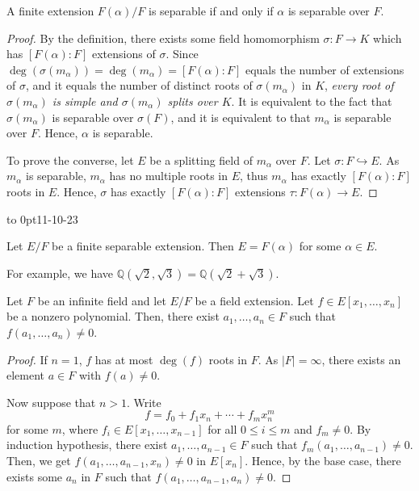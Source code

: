 \documentclass[twoside]{article}
\newcommand\Q{\mathbb Q}
\theoremstyle{remark}
\newcounter{theorem}
\newcommand*\newclass[1]{\par\vbox to 0pt{\hbox{\tiny\sffamily\color{gray}#1}} \par\ignorespaces}
\begin{document}
\begin{proposition}
  A finite extension \(F(\alpha)/F\) is separable if and only if \(\alpha\) is separable over \(F\).
\end{proposition}

\begin{proof}
  By the definition, there exists some field homomorphism \(\sigma\colon F \to K\) which has \([F(\alpha):F]\) extensions of \(\sigma\). Since \(\deg(\sigma(m_\alpha)) = \deg(m_\alpha) = [F(\alpha):F]\) equals the number of extensions of \(\sigma\), and it equals the number of distinct roots of \(\sigma(m_\alpha)\) in \(K\), \emph{every root of \(\sigma(m_\alpha)\) is simple and \(\sigma(m_\alpha)\) splits over \(K\)}. It is equivalent to the fact that \(\sigma(m_\alpha)\) is separable over \(\sigma(F)\), and it is equivalent to that \(m_\alpha\) is separable over \(F\). Hence, \(\alpha\) is separable.
  
  To prove the converse, let \(E\) be a splitting field of \(m_\alpha\) over \(F\). Let \(\sigma\colon F \hookrightarrow E\). As \(m_\alpha\) is separable, \(m_\alpha\) has no multiple roots in \(E\), thus \(m_\alpha\) has exactly \([F(\alpha):F]\) roots in \(E\). Hence, \(\sigma\) has exactly \([F(\alpha):F]\) extensions \(\tau\colon F(\alpha) \to E\).
\end{proof}

\newclass{11-10-23}

\begin{theorem}
  Let \(E/F\) be a finite separable extension. Then \(E = F(\alpha)\) for some \(\alpha \in E\).
\end{theorem}

For example, we have \(\Q(\sqrt2,\sqrt3) = \Q(\sqrt2+\sqrt3)\).

\begin{lemma}
  Let \(F\) be an infinite field and let \(E/F\) be a field extension. Let \(f \in E[x_1, \dots, x_n]\) be a nonzero polynomial. Then, there exist \(a_1, \dots, a_n \in F\) such that \(f(a_1, \dots, a_n) \neq 0\).
\end{lemma}

\begin{proof}
  If \(n=1\), \(f\) has at most \(\deg(f)\) roots in \(F\). As \(|F| = \infty\), there exists an element \(a \in F\) with \(f(a) \neq 0\).
  
  Now suppose that \(n>1\). Write
  \[ f = f_0 + f_1x_n + \cdots + f_mx_n^m \]
  for some \(m\), where \(f_i \in E[x_1, \dots, x_{n-1}]\) for all \(0 \leq i \leq m\) and \(f_m \neq 0\). By induction hypothesis, there exist \(a_1, \dots, a_{n-1} \in F\) such that \(f_m(a_1, \dots, a_{n-1}) \neq 0\). Then, we get \(f(a_1, \dots, a_{n-1},x_n) \neq 0\) in \(E[x_n]\). Hence, by the base case, there exists some \(a_n\) in \(F\) such that \(f(a_1, \dots, a_{n-1}, a_n) \neq 0\).
\end{proof}
\end{document}
